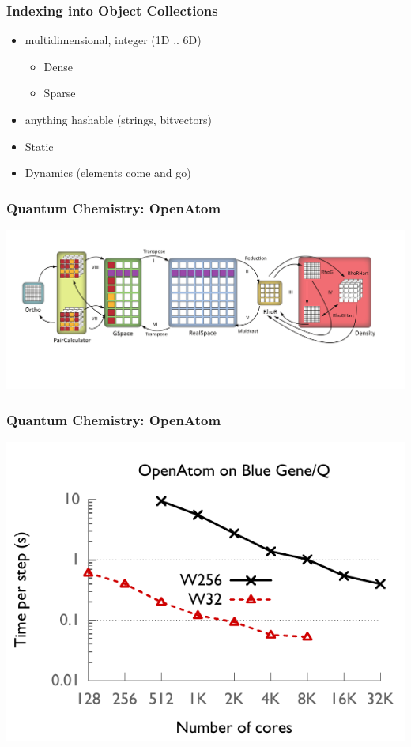 \begin{frame}
\frametitle{Indexing into Object Collections}
    \begin{itemize}
       \item multidimensional, integer (1D .. 6D)
        \begin{itemize}
            \item Dense
            \item Sparse
        \end{itemize}
       \item anything hashable (strings, bitvectors)
       \item Static
       \item Dynamics (elements come and go)
    \end{itemize}
\end{frame}


\begin{frame}
\frametitle{Quantum Chemistry: OpenAtom}
\includegraphics[width=\textwidth]{../figures/openatom/control-flow.pdf}
\end{frame}


\begin{frame}
\frametitle{Quantum Chemistry: OpenAtom}
\includegraphics[width=\textwidth]{../figures/openatom/bgq.pdf}
\end{frame}


